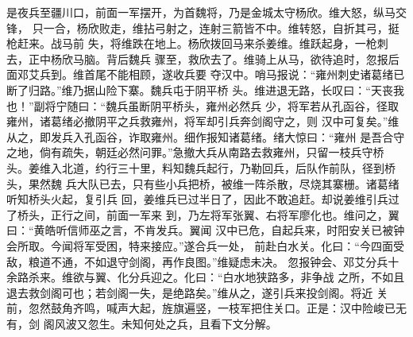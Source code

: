 是夜兵至疆川口，前面一军摆开，为首魏将，乃是金城太守杨欣。维大怒，纵马交锋，
只一合，杨欣败走，维拈弓射之，连射三箭皆不中。维转怒，自折其弓，挺枪赶来。战马前
失，将维跌在地上。杨欣拨回马来杀姜维。维跃起身，一枪刺去，正中杨欣马脑。背后魏兵
骤至，救欣去了。维骑上从马，欲待追时，忽报后面邓艾兵到。维首尾不能相顾，遂收兵要
夺汉中。哨马报说：“雍州刺史诸葛绪已断了归路。”维乃据山险下寨。魏兵屯于阴平桥
头。维进退无路，长叹曰：“天丧我也！”副将宁随曰：“魏兵虽断阴平桥头，雍州必然兵
少，将军若从孔函谷，径取雍州，诸葛绪必撤阴平之兵救雍州，将军却引兵奔剑阁守之，则
汉中可复矣。”维从之，即发兵入孔函谷，诈取雍州。细作报知诸葛绪。绪大惊曰：“雍州
是吾合守之地，倘有疏失，朝廷必然问罪。”急撤大兵从南路去救雍州，只留一枝兵守桥
头。姜维入北道，约行三十里，料知魏兵起行，乃勒回兵，后队作前队，径到桥头，果然魏
兵大队已去，只有些小兵把桥，被维一阵杀散，尽烧其寨栅。诸葛绪听知桥头火起，复引兵
回，姜维兵已过半日了，因此不敢追赶。却说姜维引兵过了桥头，正行之间，前面一军来
到，乃左将军张翼、右将军廖化也。维问之，翼曰：“黄皓听信师巫之言，不肯发兵。翼闻
汉中已危，自起兵来，时阳安关已被钟会所取。今闻将军受困，特来接应。”遂合兵一处，
前赴白水关。化曰：“今四面受敌，粮道不通，不如退守剑阁，再作良图。”维疑虑未决。
忽报钟会、邓艾分兵十余路杀来。维欲与翼、化分兵迎之。化曰：“白水地狭路多，非争战
之所，不如且退去救剑阁可也；若剑阁一失，是绝路矣。”维从之，遂引兵来投剑阁。将近
关前，忽然鼓角齐鸣，喊声大起，旌旗遍竖，一枝军把住关口。正是：汉中险峻已无有，剑
阁风波又忽生。未知何处之兵，且看下文分解。
